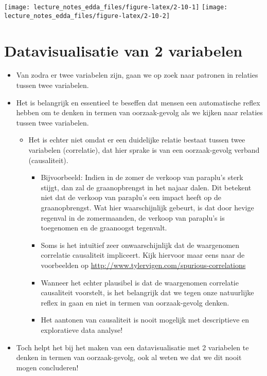 \documentclass[]{memoir}
\providecommand{\tightlist}{%
  \setlength{\itemsep}{0pt}\setlength{\parskip}{0pt}}
\begin{document}
\texttt{[image: lecture\_notes\_edda\_files/figure-latex/2-10-1]}
\texttt{[image: lecture\_notes\_edda\_files/figure-latex/2-10-2]}

\section{Datavisualisatie van 2
variabelen}\label{datavisualisatie-van-2-variabelen}

\begin{itemize}
\tightlist
\item
  Van zodra er twee variabelen zijn, gaan we op zoek naar patronen in
  relaties tussen twee variabelen.
\item
  Het is belangrijk en essentieel te beseffen dat mensen een
  automatische reflex hebben om te denken in termen van oorzaak-gevolg
  als we kijken naar relaties tussen twee variabelen.

  \begin{itemize}
  \tightlist
  \item
    Het is echter niet omdat er een duidelijke relatie bestaat tussen
    twee variabelen (correlatie), dat hier sprake is van een
    oorzaak-gevolg verband (causaliteit).

    \begin{itemize}
    \tightlist
    \item
      Bijvoorbeeld: Indien in de zomer de verkoop van paraplu's sterk
      stijgt, dan zal de graanopbrengst in het najaar dalen. Dit
      betekent niet dat de verkoop van paraplu's een impact heeft op de
      graanopbrengst. Wat hier waarschijnlijk gebeurt, is dat door
      hevige regenval in de zomermaanden, de verkoop van paraplu's is
      toegenomen en de graanoogst tegenvalt.
    \item
      Soms is het intuïtief zeer onwaarschijnlijk dat de waargenomen
      correlatie causaliteit impliceert. Kijk hiervoor maar eens naar de
      voorbeelden op
      \url{http://www.tylervigen.com/spurious-correlations}
    \item
      Wanneer het echter plausibel is dat de waargenomen correlatie
      causaliteit voorstelt, is het belangrijk dat we tegen onze
      natuurlijke reflex in gaan en niet in termen van oorzaak-gevolg
      denken.
    \item
      Het aantonen van causaliteit is nooit mogelijk met descriptieve en
      exploratieve data analyse!
    \end{itemize}
  \end{itemize}
\item
  Toch helpt het bij het maken van een datavisualisatie met 2 variabelen
  te denken in termen van oorzaak-gevolg, ook al weten we dat we dit
  nooit mogen concluderen!


\end{itemize}
\end{document}
